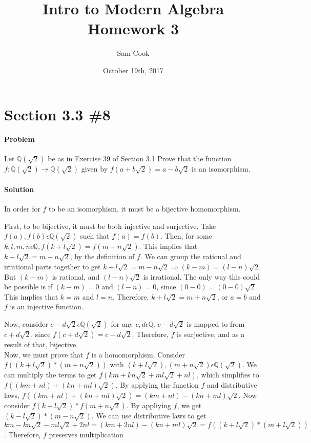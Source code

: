 \documentclass[a4paper,11pt]{article}
\author{Sam Cook}
\title{Intro to Modern Algebra \\Homework 3}
\date{October 19th, 2017}
\begin{document}
\maketitle
\section{Section 3.3 \#8}
\paragraph{Problem}
Let $\mathbb{Q}(\sqrt{2})$ be as in Exercise 39 of Section 3.1 Prove that the function $f:\mathbb{Q}(\sqrt{2})  \rightarrow \mathbb{Q}(\sqrt{2})$
given by $f(a + b\sqrt{2}) = a - b\sqrt{2}$ is an isomorphism.
\paragraph{Solution}

In order for $f$ to be an isomorphism, it must be a bijective homomorphism.

First, to be bijective, it must be both injective and surjective.
Take $f(a), f(b) \epsilon \mathbb{Q}(\sqrt{2})$ such that $f(a) = f(b)$. Then, for some $k,l,m,n \epsilon \mathbb{Q}, f(k+l\sqrt{2}) = f(m + n\sqrt{2})$. This implies that $k-l\sqrt{2} = m - n\sqrt{2}$, by the definition of $f$. We can group the rational and irrational parts together to get $k-l\sqrt{2} = m - n\sqrt{2} \Rightarrow (k-m) = (l-n)\sqrt{2}$. But $(k-m)$ is rational, and $(l-n)\sqrt{2}$ is irrational. The only way this could be possible is if $(k-m)=0$ and $(l-n)=0$, since $(0-0) = (0-0)\sqrt{2}$. This implies that $k=m$ and $l=n$. Therefore, $k+l\sqrt{2} = m + n\sqrt{2}$, or $a=b$ and $f$ is an injective function.

Now, consider $c - d\sqrt{2}  \epsilon \mathbb{Q}(\sqrt{2})$ for any $c,d \epsilon \mathbb{Q}$. $c - d\sqrt{2}$ is mapped to from $c + d\sqrt{2}$, since $f(c + d\sqrt{2}) = c - d\sqrt{2}$. Therefore, $f$ is surjective, and as a result of that, bijective.\\

Now, we must prove that $f$ is a homomorphism.
Consider  $f((k+l\sqrt{2}) * (m + n\sqrt{2}))$ with $(k+l\sqrt{2}), (m + n\sqrt{2}) \epsilon \mathbb{Q}(\sqrt{2})$. We can multiply the terms to get $f(km + kn\sqrt{2} + ml\sqrt{2} + nl)$, which simplifies to $f((km + nl) + (kn + ml)\sqrt{2})$. By applying the function $f$ and distributive laws,  $f((km + nl) + (kn + ml)\sqrt{2}) = (km + nl) - (kn + ml)\sqrt{2}$. Now consider $f(k+l\sqrt{2}) * f(m+n\sqrt{2})$. By appliying $f$, we get $(k -l\sqrt{2}) * (m - n\sqrt{2})$. We  can use distributive laws to get $km - kn\sqrt{2} - ml\sqrt{2} +2nl = (km + 2nl) - (kn + ml)\sqrt{2} = f((k+l\sqrt{2}) * (m + l\sqrt{2}))$. Therefore, $f$ preserves multiplication
\end{document}
